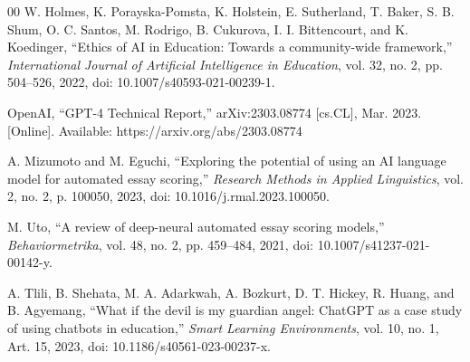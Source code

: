 \documentclass[conference]{IEEEtran}
\begin{document}
\begin{thebibliography}{00}
W. Holmes, K. Porayska-Pomsta, K. Holstein, E. Sutherland, T. Baker, S. B. Shum, O. C. Santos, M. Rodrigo, B. Cukurova, I. I. Bittencourt, and K. Koedinger, ``Ethics of AI in Education: Towards a community-wide framework,'' \textit{International Journal of Artificial Intelligence in Education}, vol. 32, no. 2, pp. 504--526, 2022, doi: 10.1007/s40593-021-00239-1.

OpenAI, ``GPT-4 Technical Report,'' arXiv:2303.08774 [cs.CL], Mar. 2023. [Online]. Available: https://arxiv.org/abs/2303.08774

A. Mizumoto and M. Eguchi, ``Exploring the potential of using an AI language model for automated essay scoring,'' \textit{Research Methods in Applied Linguistics}, vol. 2, no. 2, p. 100050, 2023, doi: 10.1016/j.rmal.2023.100050.

M. Uto, ``A review of deep-neural automated essay scoring models,'' \textit{Behaviormetrika}, vol. 48, no. 2, pp. 459--484, 2021, doi: 10.1007/s41237-021-00142-y.

A. Tlili, B. Shehata, M. A. Adarkwah, A. Bozkurt, D. T. Hickey, R. Huang, and B. Agyemang, ``What if the devil is my guardian angel: ChatGPT as a case study of using chatbots in education,'' \textit{Smart Learning Environments}, vol. 10, no. 1, Art. 15, 2023, doi: 10.1186/s40561-023-00237-x.

\end{thebibliography}
\end{document}

